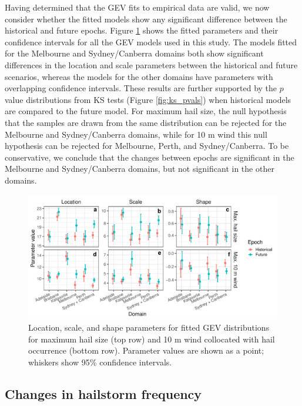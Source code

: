\documentclass[]{agujournal2019}\usepackage[]{graphicx}\usepackage[]{xcolor}
\begin{document}
Having determined that the GEV fits to empirical data are valid, we now consider whether the fitted models show any significant difference between the historical and future epochs. Figure \ref{fig:gev_parameters} shows the fitted parameters and their confidence intervals for all the GEV models used in this study. The models fitted for the Melbourne and Sydney/Canberra domains both show significant differences in the location and scale parameters between the historical and future scenarios, whereas the models for the other domains have parameters with overlapping confidence intervals. These results are further supported by the $p$ value distributions from KS tests (Figure \ref{fig:ks_pvals}) when historical models are compared to the future model. For maximum hail size, the null hypothesis that the samples are drawn from the same distribution can be rejected for the Melbourne and Sydney/Canberra domains, while for 10 m wind this null hypothesis can be rejected for Melbourne, Perth, and Sydney/Canberra. To be conservative, we conclude that the changes between epochs are significant in the Melbourne and Sydney/Canberra domains, but not significant in the other domains.

\begin{figure}[!ht]
      \includegraphics[width=\textwidth]{figures/fit_params}
      \caption{Location, scale, and shape parameters for fitted GEV distributions for maximum hail size (top row) and 10 m wind collocated with hail occurrence (bottom row). Parameter values are shown as a point; whiskers show 95\% confidence intervals.}
      \label{fig:gev_parameters}
\end{figure}

\subsection{Changes in hailstorm frequency}
\end{document}
